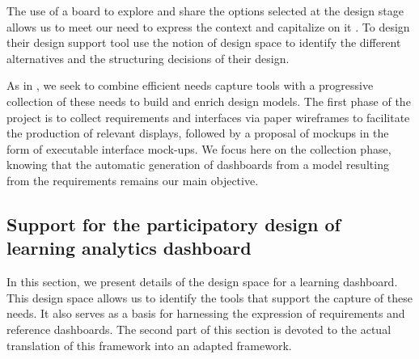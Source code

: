 \documentclass[preprint,12pt]{elsarticle}
\begin{document}
The use of a board to explore and share the options selected at the design stage allows us to meet our need to express the context and capitalize on it \cite{osterwalder2010business}. To design their design support tool \citet{hallifax2018design} use the notion of design space \cite{shaw2011role} to identify the different alternatives and the structuring decisions of their design. 

As in \cite{rivero2014mockup}, we seek to combine efficient needs capture tools with a progressive collection of these needs to build and enrich design models. The first phase of the project is to collect requirements and interfaces via paper wireframes to facilitate the production of relevant displays, followed by a proposal of mockups in the form of executable interface mock-ups. We focus here on the collection phase, knowing that the automatic generation of dashboards from a model resulting from the requirements remains our main objective.

\subsection{Support for the participatory design of learning analytics dashboard}
In this section, we present details of the design space for a learning dashboard. This design space allows us to identify the tools that support the capture of these needs. It also serves as a basis for harnessing the expression of requirements and reference dashboards. The second part of this section is devoted to the actual translation of this framework into an adapted framework.
\end{document}

